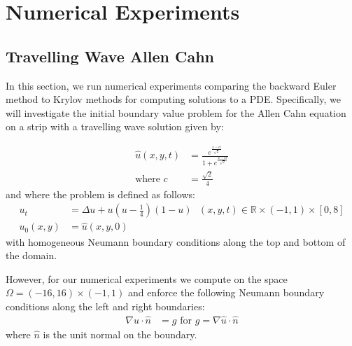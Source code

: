\section{Numerical Experiments}

\subsection{Travelling Wave Allen Cahn}
In this section, we run numerical experiments comparing the backward Euler method to Krylov methods for computing solutions to a PDE.
Specifically, we will investigate the initial boundary value problem for the Allen Cahn equation on a strip with a travelling wave solution\cite{YukitakaFukao2004} given by:

\begin{align*}
    \hat u(x,y,t)&=\frac{e^{\frac{x-ct}{\sqrt2}}}{1+e^{\frac{x-ct}{\sqrt2}}} \label{TravellingWaveSol}\\
    \text{where } c &= \frac{\sqrt{2}}{4}
\end{align*}
and where the problem is defined as follows:
\begin{align*}
    u_t&=\Delta u+u(u-\frac14)(1-u) \text{ $(x,y,t)\in \mathbb{R} \times (-1,1) \times [0, 8]$}\\
    u_0(x, y) &= \hat u(x,y, 0)
\end{align*}
with homogeneous Neumann boundary conditions along the top and bottom of the domain.

However, for our numerical experiments we compute on the space $\Omega=(-16,16)\times(-1,1)$ and enforce the following Neumann boundary conditions along the left and right boundaries:
\begin{align*}
    \nabla u \cdot \hat n &= g \text{ for $g = \nabla \hat u \cdot \hat n$}
\end{align*}
where $\hat n$ is the unit normal on the boundary.

